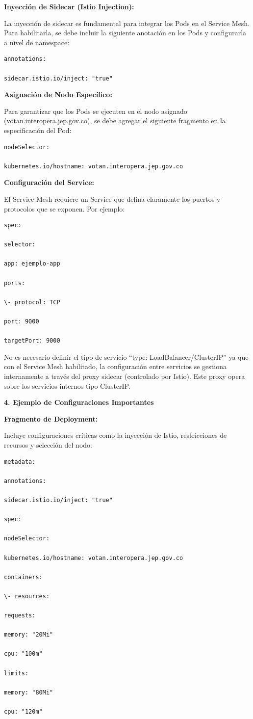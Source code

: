 \documentclass[
  paper=a4,
  ,captions=tableheading
]{scrartcl}
\begin{document}
\textbf{Inyección de Sidecar (Istio Injection):}

La inyección de sidecar es fundamental para integrar los Pods en el
Service Mesh. Para habilitarla, se debe incluir la siguiente anotación
en los Pods y configurarla a nivel de namespace:

\begin{verbatim}
annotations:

sidecar.istio.io/inject: "true"
\end{verbatim}

\textbf{Asignación de Nodo Específico:}

Para garantizar que los Pods se ejecuten en el nodo asignado
(votan.interopera.jep.gov.co), se debe agregar el siguiente fragmento en
la especificación del Pod:

\begin{verbatim}
nodeSelector:

kubernetes.io/hostname: votan.interopera.jep.gov.co
\end{verbatim}

\textbf{Configuración del Service:}

El Service Mesh requiere un Service que defina claramente los puertos y
protocolos que se exponen. Por ejemplo:

\begin{verbatim}
spec:

selector:

app: ejemplo-app

ports:

\- protocol: TCP

port: 9000

targetPort: 9000
\end{verbatim}

No es necesario definir el tipo de servicio ``type:
LoadBalancer/ClusterIP'' ya que con el Service Mesh habilitado, la
configuración entre servicios se gestiona internamente a través del
proxy sidecar (controlado por Istio). Este proxy opera sobre los
servicios internos tipo ClusterIP.

\textbf{4. Ejemplo de Configuraciones Importantes}

\textbf{Fragmento de Deployment:}

Incluye configuraciones críticas como la inyección de Istio,
restricciones de recursos y selección del nodo:

\begin{verbatim}
metadata:

annotations:

sidecar.istio.io/inject: "true"

spec:

nodeSelector:

kubernetes.io/hostname: votan.interopera.jep.gov.co

containers:

\- resources:

requests:

memory: "20Mi"

cpu: "100m"

limits:

memory: "80Mi"

cpu: "120m"
\end{verbatim}
\end{document}
